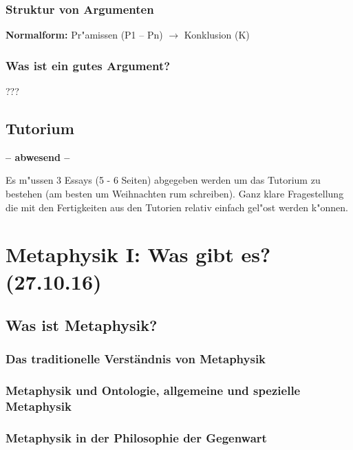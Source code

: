 \documentclass[]{scrartcl}
\begin{document}
\subsubsection{Struktur von Argumenten}
\textbf{Normalform:}  Pr"amissen (P1 -- Pn) $\rightarrow$ Konklusion (K)


\subsubsection{Was ist ein gutes Argument?}

???

\subsection{Tutorium}

\textbf{-- abwesend --}
\newline

Es m"ussen 3 Essays (5 - 6 Seiten) abgegeben werden um das Tutorium zu bestehen (am besten um Weihnachten rum schreiben). Ganz klare Fragestellung die mit den Fertigkeiten aus den Tutorien relativ einfach gel"ost werden k"onnen.


\newpage

\section{Metaphysik I: Was gibt es?\\(27.10.16)}

\subsection{Was ist Metaphysik?}


\subsubsection{Das traditionelle Verständnis von Metaphysik}


\subsubsection{Metaphysik und Ontologie, allgemeine und spezielle Metaphysik}


\subsubsection{Metaphysik in der Philosophie der Gegenwart}
\end{document}
